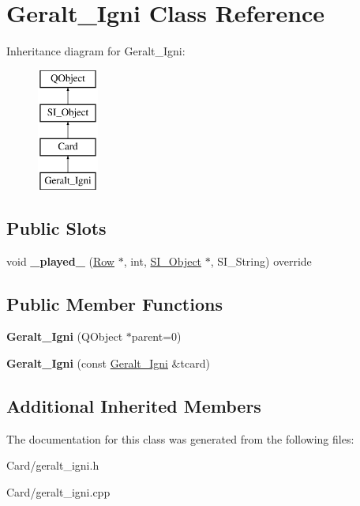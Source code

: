 \hypertarget{class_geralt___igni}{}\section{Geralt\+\_\+\+Igni Class Reference}
\label{class_geralt___igni}
Inheritance diagram for Geralt\+\_\+\+Igni\+:\begin{figure}[H]
\begin{center}
\leavevmode
\includegraphics[height=4.000000cm]{class_geralt___igni}
\end{center}
\end{figure}
\subsection*{Public Slots}
\begin{DoxyCompactItemize}
\item 
\mbox{\label{class_geralt___igni_abb274bf278e5f5c551967e72563caf70}} 
void {\bfseries \+\_\+played\+\_\+} (\hyperlink{class_card_set}{Row} $\ast$, int, \hyperlink{class_s_i___object}{S\+I\+\_\+\+Object} $\ast$, S\+I\+\_\+\+String) override
\end{DoxyCompactItemize}
\subsection*{Public Member Functions}
\begin{DoxyCompactItemize}
\item 
\mbox{\label{class_geralt___igni_a1b67911caba3c4b510bf8065a960b90f}} 
{\bfseries Geralt\+\_\+\+Igni} (Q\+Object $\ast$parent=0)
\item 
\mbox{\label{class_geralt___igni_af0630e632ebbe8316b8eb1da209f9238}} 
{\bfseries Geralt\+\_\+\+Igni} (const \hyperlink{class_geralt___igni}{Geralt\+\_\+\+Igni} \&tcard)
\end{DoxyCompactItemize}
\subsection*{Additional Inherited Members}


The documentation for this class was generated from the following files\+:\begin{DoxyCompactItemize}
\item 
Card/geralt\+\_\+igni.\+h\item 
Card/geralt\+\_\+igni.\+cpp\end{DoxyCompactItemize}
